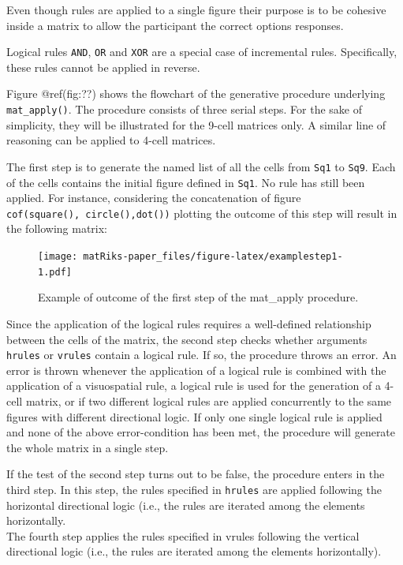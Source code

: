 Even though rules are applied to a single figure their purpose is to be cohesive inside a matrix to allow the participant the correct options responses.

Logical rules \texttt{AND}, \texttt{OR} and \texttt{XOR} are a special case of incremental rules.
Specifically, these rules cannot be applied in reverse.

Figure @ref(fig:??) shows the flowchart of the generative procedure underlying \texttt{mat\_apply()}.
The procedure consists of three serial steps.
For the sake of simplicity, they will be illustrated for the 9-cell matrices only. A similar line of reasoning can be applied to 4-cell matrices.

The first step is to generate the named list of all the cells from \texttt{Sq1} to \texttt{Sq9}.
Each of the cells contains the initial figure defined in \texttt{Sq1}. No rule has still been applied.
For instance, considering the concatenation of figure \texttt{cof(square(),\ circle(),dot())} plotting the outcome of this step will result in the following matrix:

\begin{figure}
\centering
\texttt{[image: matRiks-paper\_files/figure-latex/examplestep1-1.pdf]}
\caption{\label{fig:examplestep1}Example of outcome of the first step of the mat\_apply procedure.}
\end{figure}

Since the application of the logical rules requires a well-defined relationship between the cells of the matrix, the second step checks whether arguments \texttt{hrules} or \texttt{vrules} contain a logical rule.
If so, the procedure throws an error. An error is thrown whenever the application of a logical rule is combined with the application of a visuospatial rule, a logical rule is used for the generation of a 4-cell matrix, or if two different logical rules are applied concurrently to the same figures with different directional logic.
If only one single logical rule is applied and none of the above error-condition has been met, the procedure will generate the whole matrix in a single step.

If the test of the second step turns out to be false, the procedure enters in the third step.
In this step, the rules specified in \texttt{hrules} are applied following the horizontal directional logic (i.e., the rules are iterated among the elements horizontally.\\

The fourth step applies the rules specified in vrules following the vertical directional logic (i.e., the rules are iterated among the elements horizontally).

